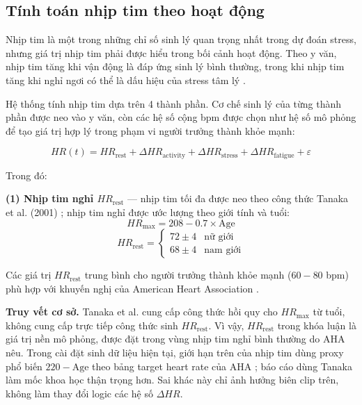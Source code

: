 \subsection{Tính toán nhịp tim theo hoạt động}
\label{subsec:heart_rate_calculation}

Nhịp tim là một trong những chỉ số sinh lý quan trọng nhất trong dự đoán stress, nhưng giá trị nhịp tim phải được hiểu trong bối cảnh hoạt động. Theo y văn, nhịp tim tăng khi vận động là đáp ứng sinh lý bình thường, trong khi nhịp tim tăng khi nghỉ ngơi có thể là dấu hiệu của stress tâm lý \cite{chrousos2009stress}.

Hệ thống tính nhịp tim dựa trên 4 thành phần. Cơ chế sinh lý của từng thành phần được neo vào y văn, còn các hệ số cộng bpm được chọn như hệ số mô phỏng để tạo giá trị hợp lý trong phạm vi người trưởng thành khỏe mạnh:

\begin{equation}
\label{eq:heart_rate}
    HR(t) = HR_{\text{rest}} + \Delta HR_{\text{activity}} + \Delta HR_{\text{stress}} + \Delta HR_{\text{fatigue}} + \varepsilon
\end{equation}

Trong đó:

\textbf{(1) Nhịp tim nghỉ $HR_{\text{rest}}$} — nhịp tim tối đa được neo theo công thức Tanaka et al. (2001) \cite{tanaka2001age}; nhịp tim nghỉ được ước lượng theo giới tính và tuổi:
\begin{equation}
    HR_{\max} = 208 - 0.7 \times \text{Age}
\end{equation}
\begin{equation}
    HR_{\text{rest}} = \begin{cases}
        72 \pm 4 & \text{nữ giới} \\
        68 \pm 4 & \text{nam giới}
    \end{cases}
\end{equation}

Các giá trị $HR_{\text{rest}}$ trung bình cho người trưởng thành khỏe mạnh ($60-80$ bpm) phù hợp với khuyến nghị của American Heart Association \cite{aha2024heart}.

\textbf{Truy vết cơ sở.} Tanaka et al. cung cấp công thức hồi quy cho $HR_{\max}$ từ tuổi, không cung cấp trực tiếp công thức sinh $HR_{\text{rest}}$. Vì vậy, $HR_{\text{rest}}$ trong khóa luận là giá trị nền mô phỏng, được đặt trong vùng nhịp tim nghỉ bình thường do AHA nêu. Trong cài đặt sinh dữ liệu hiện tại, giới hạn trên của nhịp tim dùng proxy phổ biến $220-\text{Age}$ theo bảng target heart rate của AHA \cite{aha2024target}; báo cáo dùng Tanaka làm mốc khoa học thận trọng hơn. Sai khác này chỉ ảnh hưởng biên clip trên, không làm thay đổi logic các hệ số $\Delta HR$.

